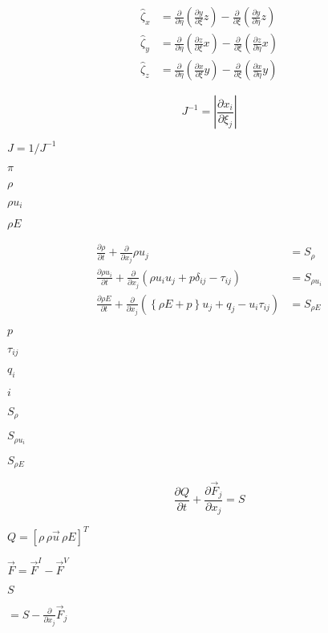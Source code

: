 \documentclass{article}
\begin{document}
\[ \begin{aligned} \hat{\zeta}_x &= \frac{\partial}{\partial \eta}\left(\frac{\partial y}{\partial \xi}z\right) - \frac{\partial}{\partial \xi}\left(\frac{\partial y}{\partial \eta}z\right) \\ \hat{\zeta}_y &= \frac{\partial}{\partial \eta}\left(\frac{\partial z}{\partial \xi}x\right) - \frac{\partial}{\partial \xi}\left(\frac{\partial z}{\partial \eta}x\right) \\ \hat{\zeta}_z &= \frac{\partial}{\partial \eta}\left(\frac{\partial x}{\partial \xi}y\right) - \frac{\partial}{\partial \xi}\left(\frac{\partial x}{\partial \eta}y\right) \end{aligned} \]
\pagebreak

\[ J^{-1} = \left|\frac{\partial x_i}{\partial \xi_j}\right| \]
\pagebreak

$J = 1/J^{-1}$
\pagebreak

$\pi$
\pagebreak

$\rho$
\pagebreak

$\rho u_i$
\pagebreak

$\rho E$
\pagebreak

\[ \begin{align} \frac{\partial \rho}{\partial t} + \frac{\partial }{\partial x_j} \rho u_j &= S_\rho \\ \frac{\partial \rho u_i}{\partial t} + \frac{\partial}{\partial x_j}\left(\rho u_i u_j + p\delta_{ij} - \tau_{ij}\right) &= S_{\rho u_i} \\ \frac{\partial \rho E}{\partial t} + \frac{\partial}{\partial x_j}\left(\left\{\rho E + p\right\}u_j + q_j - u_i \tau_{ij}\right) &= S_{\rho E} \end{align} \]
\pagebreak

$p$
\pagebreak

$\tau_{ij}$
\pagebreak

$q_i$
\pagebreak

$i$
\pagebreak

$S_\rho$
\pagebreak

$S_{\rho u_i}$
\pagebreak

$S_{\rho E}$
\pagebreak

\[ \frac{\partial Q}{\partial t} + \frac{\partial \vec{F}_j}{\partial x_j} = S \]
\pagebreak

$Q = [\rho\,\rho \vec{u}\,\rho E]^T$
\pagebreak

$\vec{F} = \vec{F}^I - \vec{F}^V$
\pagebreak

$S$
\pagebreak

$ = S - \frac{\partial}{\partial x_j}\vec{F}_j$
\pagebreak
\end{document}
